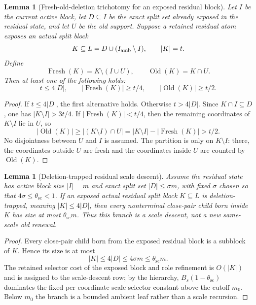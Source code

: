 \documentclass[11pt]{article}
\newtheorem{lemma}[theorem]{Lemma}
\theoremstyle{remark}
\newcommand{\Old}{\operatorname{Old}}
\newcommand{\Fresh}{\operatorname{Fresh}}
\newcommand{\scal}{\mathrm{sc}}
\begin{document}
\begin{lemma}[Fresh-old-deletion trichotomy for an exposed residual block]\label{lem:fresh-old-deletion}
Let $I$ be the current active block, let $D\subseteq I$ be the exact split set already exposed in the residual state, and let $U$ be the old support.  Suppose a retained residual atom exposes an actual split block
\[
        K\subseteq L=D\cup(I_{\rm amb}\setminus I),
        \qquad |K|=t .
\]
Define
\[
        \Fresh(K)=K\setminus(I\cup U),
        \qquad
        \Old(K)=K\cap U .
\]
Then at least one of the following holds:
\[
        t\le 4|D|,\qquad
        |\Fresh(K)|\ge t/4,\qquad
        |\Old(K)|\ge t/2 .
\]
\end{lemma}

\begin{proof}
If $t\le4|D|$, the first alternative holds.  Otherwise $t>4|D|$.  Since
$K\cap I\subseteq D$, one has $|K\setminus I|>3t/4$.  If
$|\Fresh(K)|<t/4$, then the remaining coordinates of $K\setminus I$ lie in
$U$, so
\[
        |\Old(K)|
        \ge |(K\setminus I)\cap U|
        = |K\setminus I|-|\Fresh(K)|
        > t/2 .
\]
No disjointness between $U$ and $I$ is assumed.  The partition is only on
$K\setminus I$: there, the coordinates outside $U$ are fresh and the
coordinates inside $U$ are counted by $\Old(K)$.
\end{proof}

\begin{lemma}[Deletion-trapped residual scale descent]\label{lem:deletion-scale-descent}
Assume the residual state has active block size $|I|=m$ and exact split set
$|D|\le \sigma m$, with fixed $\sigma$ chosen so that $4\sigma\le
\theta_{\scal}<1$.  If an exposed actual residual split block $K\subseteq L$
is deletion-trapped, meaning $|K|\le4|D|$, then every nonterminal close-pair
child born inside $K$ has size at most $\theta_{\scal}m$.  Thus this branch is
a scale descent, not a new same-scale old renewal.
\end{lemma}

\begin{proof}
Every close-pair child born from the exposed residual block is a subblock of
$K$.  Hence its size is at most
\[
        |K|\le4|D|\le4\sigma m\le\theta_{\scal}m .
\]
The retained selector cost of the exposed block and role refinement is
$O(|K|)$ and is assigned to the scale-descent row; by the hierarchy,
$B_s(1-\theta_{\scal})$ dominates the fixed per-coordinate scale selector
constant above the cutoff $m_0$.  Below $m_0$ the branch is a bounded ambient
leaf rather than a scale recursion.
\end{proof}
\end{document}
